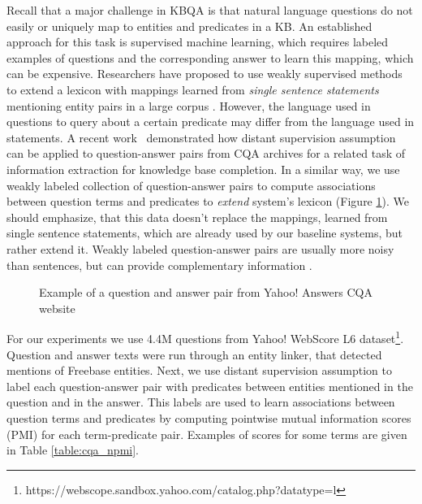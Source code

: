 Recall that a major challenge in KBQA is that natural language questions do not easily or uniquely map to entities and predicates in a KB.
An established approach for this task is supervised machine learning, which requires labeled examples of questions and the corresponding answer to learn this mapping, which can be expensive.
Researchers have proposed to use weakly supervised methods to extend a lexicon with mappings learned from \textit{single sentence statements} mentioning entity pairs in a large corpus \cite{yao2014information}.
However, the language used in questions to query about a certain predicate may differ from the language used in statements.
A recent work~\cite{savenkov-EtAl:2015:SRW} demonstrated how distant supervision assumption can be applied to question-answer pairs from CQA archives for a related task of information extraction for knowledge base completion.
In a similar way, we use weakly labeled collection of question-answer pairs to compute associations between question terms and predicates to \textit{extend} system's lexicon (Figure \ref{fig:cqa_example}).
We should emphasize, that this data doesn't replace the mappings, learned from single sentence statements, which are already used by our baseline systems, but rather extend it.
Weakly labeled question-answer pairs are usually more noisy than sentences, but can provide complementary information \cite{savenkov-EtAl:2015:SRW}.

\begin{figure}
\centering
{}
\vspace{-3mm}
\caption{Example of a question and answer pair from Yahoo! Answers CQA website}
\label{fig:cqa_example}
\end{figure}

For our experiments we use 4.4M questions from Yahoo! WebScore L6 dataset\footnote{https://webscope.sandbox.yahoo.com/catalog.php?datatype=l}.
Question and answer texts were run through an entity linker, that detected mentions of Freebase entities.
Next, we use distant supervision assumption to label each question-answer pair with predicates between entities mentioned in the question and in the answer.
This labels are used to learn associations between question terms and predicates by computing pointwise mutual information scores (PMI) for each term-predicate pair.
Examples of scores for some terms are given in Table \ref{table:cqa_npmi}.

